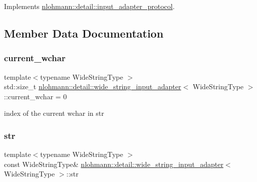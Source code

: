 Implements \hyperlink{structnlohmann_1_1detail_1_1input__adapter__protocol_aac10a6a4048a8ce8e2ed50277692a3ca}{nlohmann\+::detail\+::input\+\_\+adapter\+\_\+protocol}.



\subsection{Member Data Documentation}
\mbox{\label{classnlohmann_1_1detail_1_1wide__string__input__adapter_a196fe1fb07310dc8c2ca3a0a9ef9b27a}} 
\subsubsection{\texorpdfstring{current\+\_\+wchar}{current\_wchar}}
{\footnotesize\ttfamily template$<$typename Wide\+String\+Type $>$ \\
std\+::size\+\_\+t \hyperlink{classnlohmann_1_1detail_1_1wide__string__input__adapter}{nlohmann\+::detail\+::wide\+\_\+string\+\_\+input\+\_\+adapter}$<$ Wide\+String\+Type $>$\+::current\+\_\+wchar = 0\hspace{0.3cm}{\ttfamily [private]}}



index of the current wchar in str 

\mbox{\label{classnlohmann_1_1detail_1_1wide__string__input__adapter_a30fcb522f072d58eb0fb52cfb784e9c9}} 
\subsubsection{\texorpdfstring{str}{str}}
{\footnotesize\ttfamily template$<$typename Wide\+String\+Type $>$ \\
const Wide\+String\+Type\& \hyperlink{classnlohmann_1_1detail_1_1wide__string__input__adapter}{nlohmann\+::detail\+::wide\+\_\+string\+\_\+input\+\_\+adapter}$<$ Wide\+String\+Type $>$\+::str\hspace{0.3cm}{\ttfamily [private]}}



